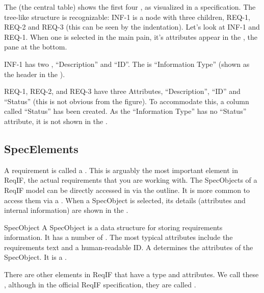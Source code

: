 The  (the central table) shows the first four , as visualized in a specification.  The tree-like structure is recognizable: INF-1 is a node
with three children, REQ-1, REQ-2 and REQ-3 (this can be seen by the indentation).  Let's look at INF-1 and REQ-1.  When one is selected in the main pain, it's attributes appear in the , the pane at the bottom.

INF-1 has two , ``Description'' and ``ID''.  The  is ``Information Type'' (shown as the header in the ).

REQ-1, REQ-2, and REQ-3 have three Attributes, ``Description'', ``ID'' and ``Status'' (this is not obvious from the figure).  To accommodate this, a column called ``Status'' has been created.  As the ``Information Type'' has no ``Status'' attribute, it is not shown in the .

\subsection{SpecElements}
\label{sec:specelements}

A requirement is called a .  This is arguably the most important element in ReqIF, the actual requirements that you are working with.  The SpecObjects of a ReqIF model can be directly accessed in \pror{} via the outline.  It is more common to access them via a .  When a SpecObject is selected, its details (attributes and internal information) are shown in the .

\begin{definition}{SpecObject}
A SpecObject is a data structure for storing requirements information.  It has a number of .  The most typical attributes include the requirements text and a human-readable ID. A  determines the attributes of the SpecObject. It is a .
\end{definition}

There are other elements in ReqIF that have a type and attributes.  We call these , although in the official ReqIF specification, they are called .

